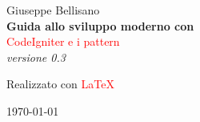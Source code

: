 
%
%
%
% 
%

\begin{titlepage}
\raggedleft %
\vspace*{\baselineskip} %
{\Large Giuseppe Bellisano}\\[0.167\textheight] %
{\LARGE\bfseries Guida allo sviluppo moderno con}\\[\baselineskip] %
{\textcolor{Red}{\Huge CodeIgniter e i pattern}}\\[\baselineskip] %
{\Large \textit{versione 0.3}}\par %

\vfill %

{\large Realizzato con{\textcolor{Red}{ \LaTeX}}}\par %
\today

\vspace*{3\baselineskip} %
\end{titlepage}

